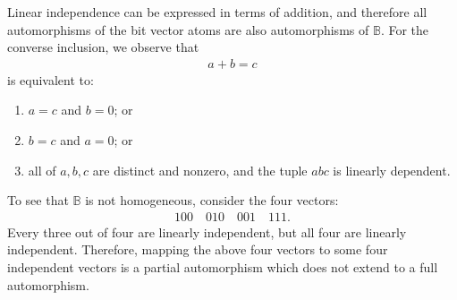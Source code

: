 	


 \exercisepart

 { Linear independence can be expressed in terms of addition, and therefore all automorphisms of the bit vector atoms are also automorphisms of $\mathbb B$. For the converse inclusion, we observe that
 \begin{align*}
 a+ b = c
 \end{align*}
 is equivalent to:
 \begin{enumerate}
 \item $a=c$ and $b=0$; or
 \item $b=c$ and $a=0$; or
 \item all of $a,b,c$ are distinct and nonzero, and the tuple $abc$ is linearly dependent.
 \end{enumerate}
 }

 { 
 To see that $\mathbb B$ is not homogeneous, consider the four vectors: 
 \begin{align*}
 100 \quad 010 \quad 001 \quad 111.
 \end{align*}
Every three out of four are linearly independent, but all four are linearly independent. Therefore, mapping the above four vectors to some four independent vectors is a partial automorphism which does not extend to a full automorphism. 
 }


 

 

